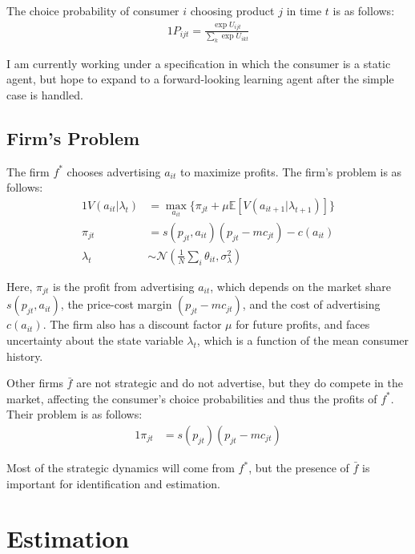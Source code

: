 \documentclass[12pt]{article}
\begin{document}
    The choice probability of consumer $i$ choosing product $j$ in time $t$ is as follows:
    \begin{alignat*}{1}
      P_{ijt} = \frac{\exp{U_{ijt}}}{\sum_k\exp{U_{ikt}}}
    \end{alignat*}

    I am currently working under a specification in which the consumer is a static agent, but hope to expand to a forward-looking learning agent after the simple case is handled.

    \subsection{Firm's Problem}

    The firm $f^*$ chooses advertising $a_{it}$ to maximize profits. The firm's problem is as follows:
    \begin{alignat*}{1}
      V(a_{it} | \lambda_t) &= \max_{a_{it}} \{\pi_{jt} + \mu \mathbb{E}[V(a_{it+1} | \lambda_{t+1})]\} \\
      \pi_{jt} &= s(p_{jt}, a_{it})(p_{jt} - mc_{jt}) - c(a_{it}) \\
      \lambda_t &\sim \mathcal{N}(\frac{1}{N}\sum_i \theta_{it}, \sigma^2_\lambda)
    \end{alignat*}

    Here, $\pi_{jt}$ is the profit from advertising $a_{it}$, which depends on the market share $s(p_{jt}, a_{it})$, the price-cost margin $(p_{jt} - mc_{jt})$, and the cost of advertising $c(a_{it})$. The firm also has a discount factor $\mu$ for future profits, and faces uncertainty about the state variable $\lambda_t$, which is a function of the mean consumer history.

    Other firms $\bar{f}$ are not strategic and do not advertise, but they do compete in the market, affecting the consumer's choice probabilities and thus the profits of $f^*$. Their problem is as follows:
    \begin{alignat*}{1}
      \pi_{jt} &= s(p_{jt})(p_{jt} - mc_{jt})
    \end{alignat*}

    Most of the strategic dynamics will come from $f^*$, but the presence of $\bar{f}$ is important for identification and estimation.

\section{Estimation}
\end{document}
